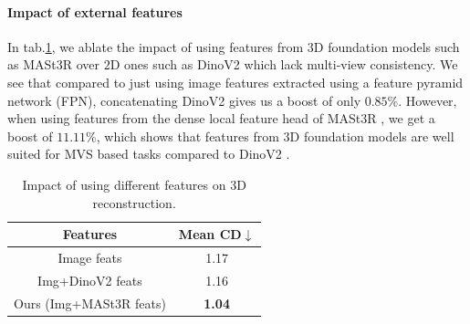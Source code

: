 \paragraph{\textbf{Impact of external features}} In tab.\ref{tab:feats}, we ablate the impact of using features from $3$D foundation models such as MASt3R \cite{leroy2024grounding} over $2$D ones such as DinoV2 \cite{oquab2023dinov2} which lack multi-view consistency. We see that compared to just using image features extracted using a feature pyramid network (FPN), concatenating DinoV2 \cite{oquab2023dinov2} gives us a boost of only $0.85\%$. However, when using features from the dense local feature head of MASt3R \cite{leroy2024grounding}, we get a boost of $11.11\%$, which shows that features from $3$D foundation models are well suited for MVS based tasks compared to DinoV2 \cite{oquab2023dinov2}. 

\begin{table}[h]
\centering
{
\hspace*{1.2\leftmargin}\begin{tabular}{ cc}
 \hline
 Features & Mean CD$\downarrow$\\
 \hline
 Image feats & 1.17 \\
 Img+DinoV2 \cite{oquab2023dinov2} feats & 1.16\\
 Ours (Img+MASt3R \cite{leroy2024grounding} feats) & \textbf{1.04}\\
 \hline
\end{tabular}
}
\caption{Impact of using different features on $3$D reconstruction.} \label{tab:feats}
\end{table}




